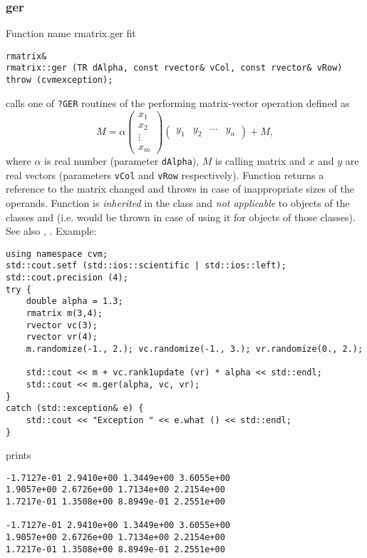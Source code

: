 \subsubsection{ger}
Function%
\pdfdest name {rmatrix.ger} fit
\begin{verbatim}
rmatrix&
rmatrix::ger (TR dAlpha, const rvector& vCol, const rvector& vRow)
throw (cvmexception);
\end{verbatim}
calls one of \verb"?GER" routines of the
performing  
matrix-vector operation defined as
\begin{equation*}
M=\alpha\begin{pmatrix}
x_1 \\
x_2 \\
\vdots \\
x_m
\end{pmatrix}
\begin{pmatrix}
y_1 & y_2 & \cdots & y_n
\end{pmatrix} + M,
\end{equation*}
where $\alpha$ is  real number
(parameter \verb"dAlpha"),
$M$ is  calling matrix
and $x$ and $y$ are real vectors (parameters \verb"vCol"
and \verb"vRow" respectively).
Function
returns a reference to the matrix changed and throws
in case of inappropriate sizes of the operands.
Function is \emph{inherited} in the class
 and
\emph{not applicable} to objects of the classes
 and
 (i.e.  would be thrown
in case of using it for objects of those classes).
See also
,
.
Example:
\begin{Verbatim}
using namespace cvm;
std::cout.setf (std::ios::scientific | std::ios::left);
std::cout.precision (4);
try {
    double alpha = 1.3;
    rmatrix m(3,4);
    rvector vc(3);
    rvector vr(4);
    m.randomize(-1., 2.); vc.randomize(-1., 3.); vr.randomize(0., 2.);

    std::cout << m + vc.rank1update (vr) * alpha << std::endl;
    std::cout << m.ger(alpha, vc, vr);
}
catch (std::exception& e) {
    std::cout << "Exception " << e.what () << std::endl;
}
\end{Verbatim}
prints
\begin{Verbatim}
-1.7127e-01 2.9410e+00 1.3449e+00 3.6055e+00
1.9057e+00 2.6726e+00 1.7134e+00 2.2154e+00
1.7217e-01 1.3508e+00 8.8949e-01 2.2551e+00

-1.7127e-01 2.9410e+00 1.3449e+00 3.6055e+00
1.9057e+00 2.6726e+00 1.7134e+00 2.2154e+00
1.7217e-01 1.3508e+00 8.8949e-01 2.2551e+00
\end{Verbatim}
\newpage



